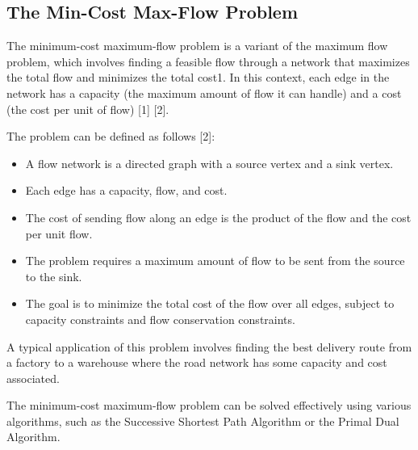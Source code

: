 	\subsection{The Min-Cost Max-Flow Problem}

		\qquad The minimum-cost maximum-flow problem is a variant of the maximum flow problem, which involves finding a feasible flow through a network that maximizes the total flow and minimizes the total cost1. In this context, each edge in the network has a capacity (the maximum amount of flow it can handle) and a cost (the cost per unit of flow) [1] [2].

		\qquad The problem can be defined as follows [2]:

		\begin{itemize}
			\item A flow network is a directed graph with a source vertex and a sink vertex.
			\item Each edge has a capacity, flow, and cost.
			\item The cost of sending flow along an edge is the product of the flow and the cost per unit flow.
			\item The problem requires a maximum amount of flow to be sent from the source to the sink.
			\item The goal is to minimize the total cost of the flow over all edges, subject to capacity constraints and flow conservation constraints.
		\end{itemize}

		\qquad A typical application of this problem involves finding the best delivery route from a factory to a warehouse where the road network has some capacity and cost associated. 

		\qquad The minimum-cost maximum-flow problem can be solved effectively using various algorithms, such as the Successive Shortest Path Algorithm or the Primal Dual Algorithm.
